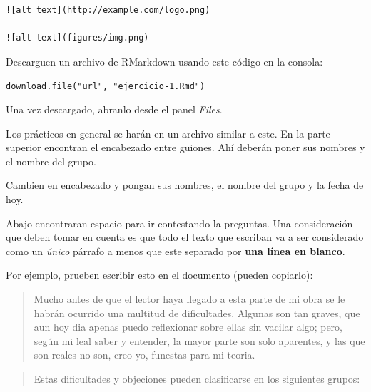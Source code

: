 \documentclass[]{book}
\theoremstyle{definition}
\theoremstyle{definition}
\theoremstyle{definition}
\theoremstyle{remark}
\let\BeginKnitrBlock\begin \let\EndKnitrBlock\end
\begin{document}
\begin{verbatim}
![alt text](http://example.com/logo.png)

![alt text](figures/img.png)
\end{verbatim}

\BeginKnitrBlock{exercise}[Probando markdown]
\protect\hypertarget{exr:ejercicio-1}{}{\label{exr:ejercicio-1}
{} }Descarguen un archivo de RMarkdown
usando este código en la consola:

\texttt{download.file("url",\ "ejercicio-1.Rmd")}

Una vez descargado, abranlo desde el panel \emph{Files}.
\EndKnitrBlock{exercise}

Los prácticos en general se harán en un archivo similar a este. En la
parte superior encontran el encabezado entre guiones. Ahí deberán poner
sus nombres y el nombre del grupo.

\BeginKnitrBlock{exercise}[Personalizando]
\protect\hypertarget{exr:ejercicio-2}{}{\label{exr:ejercicio-2}
{} }Cambien en encabezado y pongan sus
nombres, el nombre del grupo y la fecha de hoy.
\EndKnitrBlock{exercise}

Abajo encontraran espacio para ir contestando la preguntas. Una
consideración que deben tomar en cuenta es que todo el texto que
escriban va a ser considerado como un \emph{único} párrafo a menos que
este separado por \textbf{una línea en blanco}.

Por ejemplo, prueben escribir esto en el documento (pueden copiarlo):

\begin{quote}
Mucho antes de que el lector haya llegado a esta parte de mi obra se le
habrán ocurrido una multitud de dificultades. Algunas son tan graves,
que aun hoy dia apenas puedo reflexionar sobre ellas sin vacilar algo;
pero, según mi leal saber y entender, la mayor parte son solo aparentes,
y las que son reales no son, creo yo, funestas para mi teoria.
\end{quote}

\begin{quote}
Estas dificultades y objeciones pueden clasificarse en los siguientes
grupos:
\end{quote}
\end{document}
